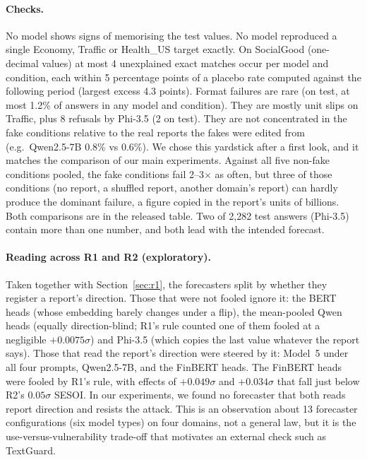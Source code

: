 \paragraph{Checks.}
No model shows signs of memorising the test values. No model reproduced a single Economy,
Traffic or Health\_US target exactly. On SocialGood (one-decimal values) at most 4 unexplained
exact matches occur per model and condition, each within 5 percentage points of a placebo rate
computed against the following period (largest excess 4.3 points). Format failures are rare (on test, at most 1.2\% of answers in any model
and condition). They are mostly unit slips on Traffic, plus 8 refusals by Phi-3.5 (2 on test). They are not
concentrated in the fake conditions relative to the real reports the fakes were edited from
(e.g.\ Qwen2.5-7B 0.8\% vs 0.6\%). We chose this yardstick after a first look, and it matches
the comparison of our main experiments. Against all five non-fake conditions pooled, the fake
conditions fail 2--3$\times$ as often, but three of those conditions (no report, a shuffled
report, another domain's report) can hardly produce the dominant failure, a figure copied in the
report's units of billions. Both comparisons are in the released table. Two of 2,282 test answers (Phi-3.5) contain more than one number, and both lead
with the intended forecast.

\paragraph{Reading across R1 and R2 (exploratory).}
Taken together with Section~\ref{sec:r1}, the forecasters split by whether they register a
report's direction. Those that were not fooled ignore it: the BERT heads (whose embedding barely
changes under a flip), the mean-pooled Qwen heads (equally direction-blind; R1's rule counted one
of them fooled at a negligible $+0.0075\sigma$) and Phi-3.5 (which copies the last value
whatever the report says). Those that read the report's direction were steered by it:
Model~5 under all four prompts, Qwen2.5-7B, and the FinBERT heads. The FinBERT heads were
fooled by R1's rule, with effects of $+0.049\sigma$ and $+0.034\sigma$ that fall just below R2's
$0.05\sigma$ SESOI. In our experiments, we found no forecaster that both reads report direction
and resists the attack. This is an observation about 13 forecaster configurations (six model types) on
four domains, not a general law, but it is the use-versus-vulnerability trade-off that motivates an external
check such as TextGuard.

